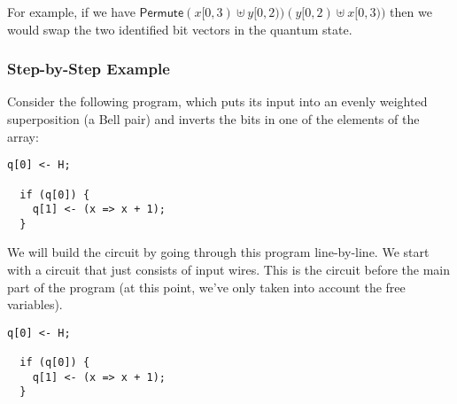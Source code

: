 \documentclass[runningheads]{llncs}
\newcommand {\Permute} {\textsf{Permute}}
\begin{document}
For example, if we have $\Permute(x[0, 3) \uplus y[0, 2))(y[0, 2)\uplus x[0, 3))$ then we would swap the two identified bit vectors in the quantum state.

\subsubsection{Step-by-Step Example}

Consider the following program, which puts its input into an evenly weighted superposition (a Bell pair) and inverts the bits in one of the elements of the array:

\begin{lstlisting}[frame=single]
  q[0] <- H;

  if (q[0]) {
    q[1] <- (x => x + 1);
  }
\end{lstlisting}

We will build the circuit by going through this program line-by-line. We start with a circuit that just consists of input wires. This is the circuit before the main part of the program (at this point, we've only taken into account the free variables).\\

\begin{minipage}{.5\textwidth}
\begin{lstlisting}[frame=single]
  q[0] <- H;

  if (q[0]) {
    q[1] <- (x => x + 1);
  }
\end{lstlisting}
\end{minipage}%
~~~
\begin{minipage}{.5\textwidth}
\end{minipage}
\end{document}
